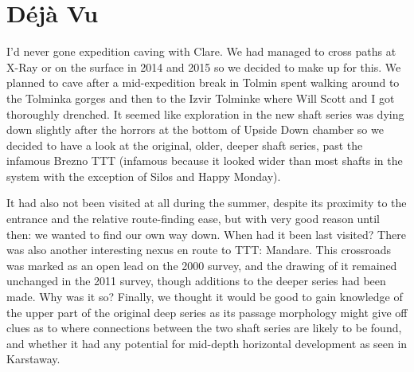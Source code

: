 \section{Déjà Vu}
\begin{marginfigure}
\end{marginfigure}

I’d never gone expedition caving with Clare. We had managed to cross paths at X-Ray or on the surface in 2014 and 2015 so we decided to make up for this. We planned to cave after a mid-expedition break in Tolmin spent walking around to the Tolminka gorges and then to the Izvir Tolminke where Will Scott and I got thoroughly drenched. It seemed like exploration in the new shaft series was dying down slightly after the horrors at the bottom of Upside Down chamber so we decided to have a look at the original, older, deeper shaft series, past the infamous Brezno TTT (infamous because it looked wider than most shafts in the system with the exception of Silos and Happy Monday).

It had also not been visited at all during the summer, despite its proximity to the entrance and the relative route-finding ease, but with very good reason until then: we wanted to find our own way down. When had it been last visited? There was also another interesting nexus en route to TTT: Mandare. This crossroads was marked as an open lead on the 2000 survey, and the drawing of it remained unchanged in the 2011 survey, though additions to the deeper series had been made. Why was it so? Finally, we thought it would be good to gain knowledge of the upper part of the original deep series as its passage morphology might give off clues as to where connections between the two shaft series are likely to be found, and whether it had any potential for mid-depth horizontal development as seen in Karstaway. 


